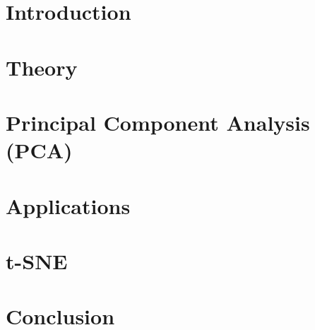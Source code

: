 







 

\begin{titlepage}


\end{titlepage}


\setcounter{savepage}{\value{page}}


\section{Introduction}

\clearpage

\section{Theory}

\clearpage

\section{Principal Component Analysis (PCA)}

\clearpage

\section{Applications}

\clearpage

\section{t-SNE}

\clearpage

\section{Conclusion}

\clearpage

\singlespacing
\appendix
{}
\setcounter{page}{\numexpr\value{savepage}}





